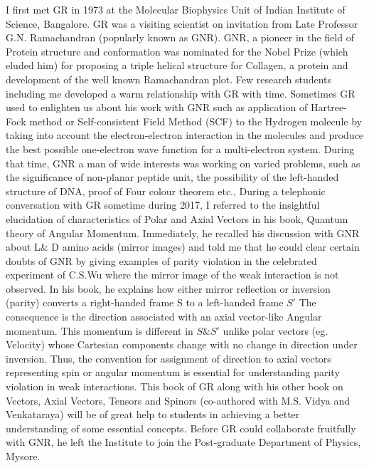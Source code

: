I first met GR in 1973 at the Molecular Biophysics Unit of Indian Institute of Science, Bangalore. GR was a visiting scientist on invitation from Late Professor G.N. Ramachandran (popularly known as GNR). GNR, a pioneer in the field of Protein structure and conformation was nominated for the Nobel Prize (which eluded him) for proposing a triple helical structure for Collagen, a protein and development of the well known Ramachandran plot. Few research students including me developed a warm relationship with GR with time. Sometimes GR used to enlighten us about his work with GNR such as application of Hartree-Fock method or Self-consistent Field Method (SCF) to the Hydrogen molecule by taking into account the electron-electron interaction in the molecules and produce the best possible one-electron wave function for a multi-electron system. During that time, GNR a man of wide interests was working on varied problems, such as the significance of non-planar peptide unit, the possibility of the left-handed structure of DNA, proof of Four colour theorem etc., During a telephonic conversation with GR sometime during 2017, I referred to the insightful elucidation of characteristics of Polar and Axial Vectors in his book, Quantum theory of Angular Momentum. Immediately, he recalled his discussion with GNR about L\& D amino acids (mirror images) and told me that he could clear certain doubts of GNR by giving examples of parity violation in the celebrated experiment of C.S.Wu where the mirror image of the weak interaction is not observed. In his book, he explains how either mirror reflection or inversion (parity) converts a right-handed frame S to a left-handed frame $S'$ The consequence is the direction associated with an axial vector-like Angular momentum. This momentum is different in $S \& S'$ unlike polar vectors (eg. Velocity) whose Cartesian components change with no change in direction under inversion. Thus, the convention for assignment of direction to axial vectors representing spin or angular momentum is essential for understanding parity violation in weak interactions. This book of GR along with his other book on Vectors, Axial Vectors, Tensors and Spinors (co-authored with M.S. Vidya and Venkataraya) will be of great help to students in achieving a better understanding of some essential concepts. Before GR could collaborate fruitfully with GNR, he left the Institute to join the Post-graduate Department of Physics, Mysore.  

